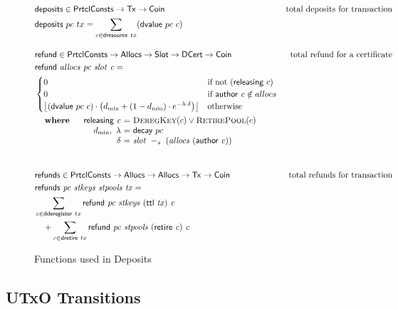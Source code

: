 \documentclass[11pt,a4paper]{article}
\newcommand{\Tx}{\type{Tx}}
\newcommand{\Coin}{\type{Coin}}
\newcommand{\PrtclConsts}{\type{PrtclConsts}}
\newcommand{\Slot}{\type{Slot}}
\newcommand{\Allocs}{\type{Allocs}}
\newcommand{\DCert}{\type{DCert}}
\newcommand{\ttl}[1]{\fun{ttl}~ \var{#1}}
\newcommand{\refund}[4]{\fun{refund}~ \var{#1}~ \var{#2}~ \var{#3}~ \var{#4}}
\newcommand{\refunds}[4]{\fun{refunds}~ \var{#1}~ \var{#2}~ \var{#3}~ \var{#4}}
\newcommand{\DeregKey}[1]{\textsc{DeregKey}(#1)}
\newcommand{\RetirePool}[1]{\textsc{RetirePool}(#1)}
\newcommand{\cauthor}[1]{\fun{author}~ \var{#1}}
\newcommand{\retire}[1]{\fun{retire}~ \var{#1}}
\newcommand{\slotminus}[2]{\var{#1}~-_{s}~\var{#2}}
\DeclarePairedDelimiter\floor{\lfloor}{\rfloor}
\theoremstyle{definition}
\theoremstyle{definition}
\begin{document}
\begin{figure}
  \begin{align*}
      & \fun{deposits} \in \PrtclConsts \to \Tx \to \Coin
      & \text{total deposits for transaction} \\
      & \fun{deposits}~{pc}~{tx} = \sum\limits_{c \in \fun{dresource}~tx} (\fun{dvalue}~pc~c)
      \nextdef
      & \fun{refund} \in \PrtclConsts \to \Allocs \to \Slot \to \DCert \to \Coin
      & \text{total refund for a certificate} \\
      & \refund{allocs}{pc}{slot}{c} =\\
      & \begin{cases}
        0 & \text{if not}~(\fun{releasing}~c)\\
            0 & \text{if}~\cauthor c \notin allocs\\
            \floor*{
              \left(\fun{dvalue}~pc~c\right) \cdot
            \left(d_{\min}+(1-d_{\min})\cdot e^{-\lambda\cdot\delta}\right)}
            & \text{otherwise}
        \end{cases}\\
      &
      \begin{array}{lr@{~=~}l}
        \where &\fun{releasing}~\var{c} & \DeregKey{c} \lor \RetirePool{c}\\
        & d_{\min},~\lambda & \fun{decay}~pc\\
        &\delta & \slotminus{slot}{(allocs~(\cauthor c))}\\
      \end{array}\\
      \nextdef
      & \fun{refunds} \in \PrtclConsts \to \Allocs \to \Allocs \to \Tx \to \Coin
      & \text{total refunds for transaction} \\
      & \refunds{pc}{stkeys}{stpools}{tx} =\\
      &   \sum\limits_{c \in \fun{dderegister}~tx} \refund{pc}{stkeys}{(\ttl{tx})}{c}\\
      &   ~~~+ \sum\limits_{c \in \fun{dretire}~tx} \refund{pc}{stpools}{(\retire{c})}{c}
  \end{align*}
  \caption{Functions used in Deposits}
  \label{fig:functions:deposits}
\end{figure}



\subsection{UTxO Transitions}
\label{sec:state-trans-utxo-1}
\end{document}
